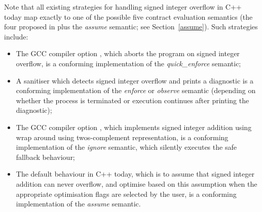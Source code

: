 Note that all existing strategies for handling signed integer overflow in C++ today map exactly to one of the possible five contract evaluation semantics (the four proposed in \cite{P2900R8} plus the \emph{assume} semantic; see Section~\ref{assume}). Such strategies include:
\begin{itemize}
\item The GCC compiler option , which aborts the program on signed integer overflow, is a conforming implementation of the \emph{quick_enforce} semantic;
\item A sanitiser which detects signed integer overflow and prints a diagnostic is a conforming
implementation of the \emph{enforce} or \emph{observe} semantic (depending on whether the
process is terminated or execution continues after printing the diagnostic);
\item The GCC compiler option , which implements signed integer addition using wrap around using twos-complement representation, is a conforming implementation of the \emph{ignore} semantic, which silently executes the safe fallback behaviour;
\item The default behaviour in C++ today, which is to assume that signed integer addition can never overflow, and optimise based on this assumption when the appropriate optimisation flags are selected by the user, is a conforming implementation of the \emph{assume} semantic.
\end{itemize}

